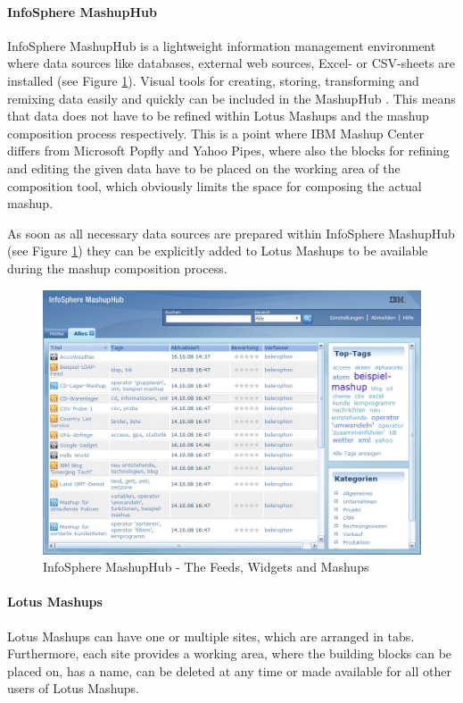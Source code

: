 \paragraph{InfoSphere MashupHub}
InfoSphere MashupHub is a lightweight information management environment where data sources
like databases, external web sources, Excel- or CSV-sheets are installed (see Figure
\ref{fig:ibm_mashup_center_mashuphub_all}). Visual tools for creating, storing, transforming and
remixing data easily and quickly can be included in the MashupHub \cite{ibm_mashup_center}.\newline
This means that data does not have to be refined within Lotus Mashups and the mashup composition
process respectively. This is a point where IBM Mashup Center differs from Microsoft Popfly and Yahoo
Pipes, where also the blocks for refining and editing the given data have to be placed on the working
area of the composition tool, which obviously limits the space for composing the actual mashup.

As soon as all necessary data sources are prepared within InfoSphere MashupHub
(see Figure \ref{fig:ibm_mashup_center_mashuphub_all}) they can be explicitly
added to Lotus Mashups to be available during the mashup composition process.

\begin{figure}
	\centering
		\includegraphics{Bilder/ibm_mashup_center_mashuphub_all.jpg}
	\caption{InfoSphere MashupHub - The Feeds, Widgets and Mashups}
	\label{fig:ibm_mashup_center_mashuphub_all}
\end{figure}

\paragraph{Lotus Mashups}
Lotus Mashups can have one or multiple sites, which are arranged in tabs. Furthermore, each site
provides a working area, where the building blocks can be placed on, has a name, can be deleted at
any time or made available for all other users of Lotus Mashups.

